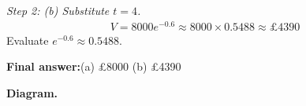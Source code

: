\documentclass[11pt]{article}
\begin{document}
\textit{Step 2: (b) Substitute \( t = 4 \).}
\[\begin{gathered}
V = 8000e^{-0.6} \approx 8000 \times 0.5488 \approx \pounds 4390
\end{gathered}\]
Evaluate \( e^{-0.6} \approx 0.5488 \).

\begin{answerbox}
\textbf{Final answer:}\quad (a) \pounds 8000 \quad  (b) \pounds 4390
\end{answerbox}
\textbf{Diagram.}

\begin{center}
\end{center}
\end{document}
